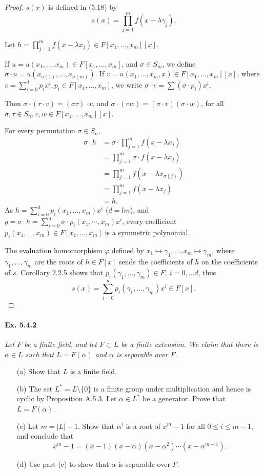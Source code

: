 \documentclass[11pt,a4paper]{article}
\begin{document}
\begin{proof}
$s(x)$ is defined in (5.18) by
 $$s(x) =\prod_{j=1}^m f(x-\lambda \gamma_j).$$

Let $h= \prod\limits_{j=1}^m f(x-\lambda x_j) \in F[x_1,\ldots,x_m][x]$.

If $u = u(x_1,\ldots,x_m) \in F[x_1,\ldots,x_m]$, and $\sigma \in S_m$, we define $\sigma \cdot u =u(x_{\sigma(1)},\ldots,x_{\sigma(m)})$. If $v =u(x_1,\ldots,x_m,x) \in F[x_1,\ldots,x_m][x]$, where $v = \sum\limits_{i=0}^d p_i x^i, p_i \in F[x_1,\ldots,x_m]$, we write $\sigma \cdot v = \sum (\sigma \cdot p_i) x^i$. 

Then $\sigma\cdot(\tau \cdot  v )= (\sigma \tau) \cdot v$, and $\sigma\cdot (vw) = (\sigma\cdot v) (\sigma\cdot w)$, for all $\sigma,\tau \in S_n, v,w \in F[x_1,\ldots,x_m][x]$.

For every permutation $\sigma \in S_n$, 
\begin{align*}
\sigma \cdot h &= \sigma \cdot  \prod_{j=1}^m f(x-\lambda x_j)\\
&= \prod_{j=1}^m \sigma \cdot f(x-\lambda x_j)\\
&=\prod_{j=1}^m f(x-\lambda x_{\sigma(j)})\\
&=\prod_{j=1}^m f(x-\lambda x_j)\\
&=h.
\end{align*}
As $h = \sum\limits_{i=0}^d p_i(x_1,\ldots,x_m) x^i$ ($d = lm$), and $g = \sigma \cdot h = \sum\limits_{i=0}^d \sigma \cdot p_i(x_1,\cdots,x_m) x^i$, every coefficient $p_i(x_1,\ldots,x_m)\in F[x_1,\ldots,x_m]$ is a symmetric polynomial. 

The evaluation homomorphism $\varphi$ defined by $x_1\mapsto \gamma_1,\ldots, x_m \mapsto \gamma_m$, where $\gamma_1,\ldots,\gamma_m$ are the roots of $h \in F[x]$ sends the coefficients of $h$ on the coefficients of $s$. Corollary 2.2.5 shows that $p_i(\gamma_1,\dots,\gamma_m) \in F,\  i=0,\ldots d$, thus $$s(x) =\sum\limits_{i=0}^d p_i(\gamma_1,\ldots,\gamma_m) x^i \in F[x].$$
\end{proof}

\paragraph{Ex. 5.4.2}

{\it Let $F$ be a finite field, and let $F \subset L$ be a finite extension. We claim that there is $\alpha \in L$ such that $L = F(\alpha)$ and $\alpha$ is separable over $F$.
\begin{enumerate}
\item[(a)] Show that $L$ is a finite field.
\item[(b)] The set $L^* = L \setminus \{0\}$ is a finite group under multiplication and hence is cyclic by Proposition A.5.3. Let $\alpha \in L^*$ be a generator. Prove that $L = F(\alpha)$.
\item[(c)] Let $m = |L| - 1$. Show that $\alpha^i$ is a root of $x^m-1$ for all $0\leq i\leq m-1$, and conclude that
$$x^m-1 = (x-1)(x-\alpha)(x-\alpha^2)\cdots(x-\alpha^{m-1}).$$
\item[(d)] Use part (c) to show that $\alpha$ is separable over $F$.
\end{enumerate}
}
\end{document}
